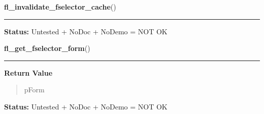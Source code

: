     \label{xformslib:library:fl_invalidate_fselector_cache}

    \vspace{0.5ex}

\hspace{.8\funcindent}\begin{boxedminipage}{\funcwidth}

    \raggedright \textbf{fl\_invalidate\_fselector\_cache}()

    \vspace{-1.5ex}

    \rule{\textwidth}{0.5\fboxrule}
\setlength{\parskip}{2ex}
\setlength{\parskip}{1ex}
\textbf{Status:} Untested + NoDoc + NoDemo = NOT OK



    \end{boxedminipage}

    \label{xformslib:library:fl_get_fselector_form}

    \vspace{0.5ex}

\hspace{.8\funcindent}\begin{boxedminipage}{\funcwidth}

    \raggedright \textbf{fl\_get\_fselector\_form}()

    \vspace{-1.5ex}

    \rule{\textwidth}{0.5\fboxrule}
\setlength{\parskip}{2ex}
\setlength{\parskip}{1ex}
      \textbf{Return Value}
    \vspace{-1ex}

      \begin{quote}
      pForm

      \end{quote}

\textbf{Status:} Untested + NoDoc + NoDemo = NOT OK



    \end{boxedminipage}

    \label{xformslib:library:fl_get_fselector_fdstruct}

